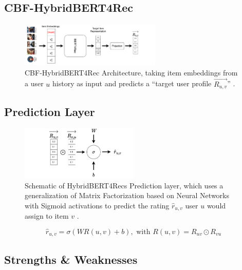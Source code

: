 \documentclass{Academic}
\begin{document}
        \subsection{CBF-HybridBERT4Rec}
        \begin{figure}[ht!]
            \centering
            \includegraphics[width=0.6\textwidth]{images/CBF-HybridBERT4Rec.pdf}
            \caption{CBF-HybridBERT4Rec Architecture, taking item embeddings from a user $u$ history as input and predicts a \enquote{target user profile $\overrightarrow{R_{u,v}}$} \cite{channarongHybridBERT4RecHybridContentBased2022}.}
            \label{fig:cbf-arch}
        \end{figure}

        \subsection{Prediction Layer}
        \begin{figure}[ht!]
            \centering
            \includegraphics[width=0.5\textwidth]{images/Prediction_Layer.pdf}
            \caption{Schematic of HybridBERT4Recs Prediction layer, which uses a generalization of Matrix Factorization based on Neural Networks with Sigmoid activations to predict the rating $\hat{r}_{u,v}$ user $u$ would assign to item $v$ \cite{channarongHybridBERT4RecHybridContentBased2022}.}
            \label{fig:pred_layer}
        \end{figure}
        \begin{equation}
            \hat{r}_{u,v} = \sigma(WR(u,v) + b), \text{ with }
            R(u,v) = R_{uv} \odot R_{vu}
        \end{equation}

        \subsection{Strengths \& Weaknesses}
\end{document}
